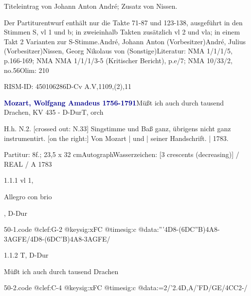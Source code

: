 \documentclass[a4paper, twocolumn, 11pt]{book}
\begin{document}
\newline %
\par Titeleintrag von Johann Anton André; Zusatz von Nissen.
\par Der Partiturentwurf enthält nur die Takte 71-87 und 123-138, ausgeführt in den Stimmen S, vl 1 und b; in zweieinhalb Takten zusätzlich vl 2 und vla; in einem Takt 2 Varianten zur S-Stimme.\newline André, Johann Anton  (Vorbesitzer)\newline André, Julius  (Vorbesitzer)\newline Nissen, Georg Nikolaus von  (Sonstige)\newline Literatur: NMA  1/1/1/5, p.166-169; NMA  NMA 1/1/1/3-5 (Kritischer Bericht), p.e/7; NMA  10/33/2, no.56\newline Olim: 210
\par RISM-ID: 450106286\newline D-Cv  A.V,1109,(2),11
\par \vspace{16pt} \textcolor{darkblue}{\textbf{Mozart, Wolfgang Amadeus  1756-1791}}\hfillplus{[50]}\newline Müßt ich auch durch tausend Drachen, KV 435 - D-Dur\newline T, orch
\par \begin{itshape} H.h. N.2. [crossed out: N.33] Singstimme und Baß ganz, übrigens nicht ganz instrumentirt. [on the right:] Von Mozart | und | seiner Handschrift. | 1783.\end{itshape} 
\par \textcolor{darkblue}{}  Partitur: 8f.; 23,5 x 32 cm\newline Autograph\newline Wasserzeichen: [3 crescents (decreasing)] / REAL / A  1783
\par 1.1.1  vl 1, \begin{itshape}Allegro con brio\end{itshape}, D-Dur  
\begin{filecontents*}{50-1.code}
@clef:G-2
@keysig:xFC
@timesig:c
@data:'''4D8-(6{DC''B})4A8-{3AGFE}/4D8-(6{DC'B})4A8-{3AGFE}/
\end{filecontents*}

\newline %
\par 1.1.2  T, D-Dur\newline \begin{footnotesize} Müßt ich auch durch tausend Drachen \end{footnotesize}  
\begin{filecontents*}{50-2.code}
@clef:C-4
@keysig:xFC
@timesig:c
@data:=2/'2.4D,A/'FD/GE/4CC2-/
\end{filecontents*}
\end{document}
